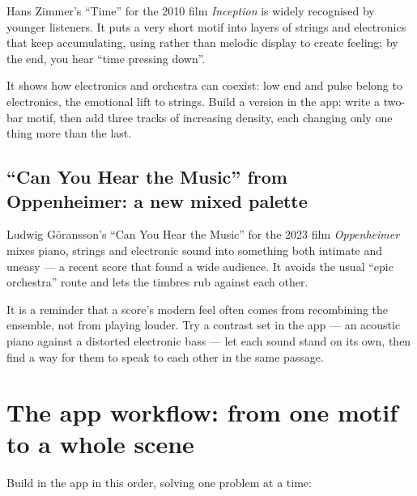Hans Zimmer's ``Time'' for the 2010 film \emph{Inception} is widely recognised by younger listeners. It puts a very short motif into layers of strings and electronics that keep accumulating, using  rather than melodic display to create feeling; by the end, you hear ``time pressing down''.

It shows how electronics and orchestra can coexist: low end and pulse belong to electronics, the emotional lift to strings. Build a version in the app: write a two-bar motif, then add three tracks of increasing density, each changing only one thing more than the last.

\subsection{``Can You Hear the Music'' from Oppenheimer: a new mixed palette}
\label{sec:film-case-oppenheimer}

Ludwig Göransson's ``Can You Hear the Music'' for the 2023 film \emph{Oppenheimer} mixes piano, strings and electronic sound into something both intimate and uneasy --- a recent score that found a wide audience. It avoids the usual ``epic orchestra'' route and lets the timbres rub against each other.

It is a reminder that a score's modern feel often comes from recombining the ensemble, not from playing louder. Try a contrast set in the app --- an acoustic piano against a distorted electronic bass --- let each sound stand on its own, then find a way for them to speak to each other in the same passage.

\section{The app workflow: from one motif to a whole scene}
\label{sec:film-yeban}

Build in the app in this order, solving one problem at a time:

